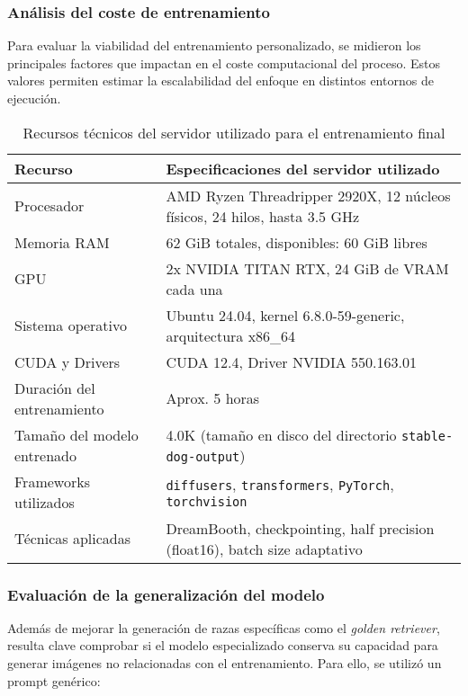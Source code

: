 \subsubsection{Análisis del coste de entrenamiento}

Para evaluar la viabilidad del entrenamiento personalizado, se midieron los principales factores que impactan en el coste computacional del proceso. Estos valores permiten estimar la escalabilidad del enfoque en distintos entornos de ejecución.

\begin{table}[H]
\centering
\renewcommand{\arraystretch}{1.5}
\begin{tabular}{|p{5cm}|p{9cm}|}
\hline
\rowcolor{gray!30}
\textbf{Recurso} & \textbf{Especificaciones del servidor utilizado} \\
\hline
Procesador & AMD Ryzen Threadripper 2920X, 12 núcleos físicos, 24 hilos, hasta 3.5 GHz \\
\hline
Memoria RAM & 62 GiB totales, disponibles: 60 GiB libres \\
\hline
GPU & 2x NVIDIA TITAN RTX, 24 GiB de VRAM cada una \\
\hline
Sistema operativo & Ubuntu 24.04, kernel 6.8.0-59-generic, arquitectura x86\_64 \\
\hline
CUDA y Drivers & CUDA 12.4, Driver NVIDIA 550.163.01 \\
\hline
Duración del entrenamiento & Aprox. 5 horas \\
\hline
Tamaño del modelo entrenado & 4.0K (tamaño en disco del directorio \texttt{stable-dog-output}) \\
\hline
Frameworks utilizados & \texttt{diffusers}, \texttt{transformers}, \texttt{PyTorch}, \texttt{torchvision} \\
\hline
Técnicas aplicadas & DreamBooth, checkpointing, half precision (float16), batch size adaptativo \\
\hline
\end{tabular}
\caption{Recursos técnicos del servidor utilizado para el entrenamiento final}
\label{tab:servidor-entrenamiento}
\end{table}

\subsubsection{Evaluación de la generalización del modelo}

Además de mejorar la generación de razas específicas como el \textit{golden retriever}, resulta clave comprobar si el modelo especializado conserva su capacidad para generar imágenes no relacionadas con el entrenamiento. Para ello, se utilizó un prompt genérico:

